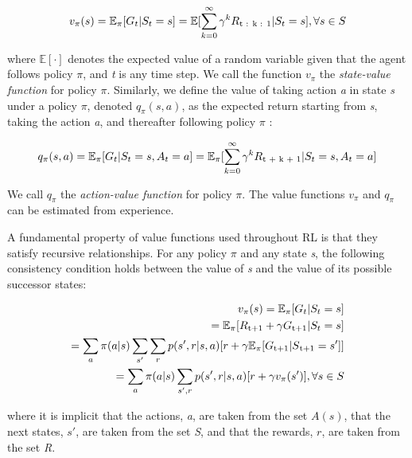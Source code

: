 \begin{equation}
  v_\pi(s) = \mathbb{E}_\pi[G_t | S_t = s] = \mathbb{E}[\sum_{k = 0} ^ {\infty} \gamma^k R\textsubscript{t : k : 1} | S_t = s], \forall s \in S
\end{equation}

where $\mathbb{E}[\cdot]$ denotes the expected value of a random variable given that the agent follows policy $\pi$, and \textit{t} is any time step. We call the function $v_\pi$ the \textit{state-value function} for policy $\pi$.
Similarly, we define the value of taking action \textit{a} in state \textit{s} under a policy $\pi$, denoted $q_\pi(s, a)$, as the expected return starting from \textit{s}, taking the action \textit{a}, and thereafter following policy $\pi$ :

\begin{equation}
  q_\pi(s,a) = \mathbb{E}_\pi[G_t | S_t = s, A_t = a] = \mathbb{E}_\pi[\sum_{k = 0}^{\infty}\gamma^k R\textsubscript{t + k + 1} |S_t = s, A_t = a]  
\end{equation}

We call $q_\pi$ the \textit{action-value function} for policy $\pi$. The value functions $v_\pi$ and $q_\pi$ can be estimated from experience.

A fundamental property of value functions used throughout RL is that they satisfy recursive relationships. For any policy $\pi$ and any state \textit{s}, the following consistency condition holds between the value of \textit{s} and the value of its possible successor states:

\begin{equation}
\begin{split}
  v_\pi(s) = \mathbb{E}_\pi[G_t | S_t = s] \\
           = \mathbb{E}_\pi[R\textsubscript{t+1} + \gamma G\textsubscript{t+1} |S_t = s] \\
           = \sum_{a}\pi(a|s)\sum_{s'}\sum_{r}p(s', r | s, a)[r + \gamma\mathbb{E}_\pi[G\textsubscript{t+1} | S\textsubscript{t+1} = s']] \\
           = \sum_{a}\pi(a|s)\sum_{s', r} p(s', r | s, a)[r + \gamma v_\pi (s')], \forall s \in S
\end{split}
\end{equation} 

where it is implicit that the actions, \textit{a}, are taken from the set $A(s)$, that the next states, $s'$, are taken from the set \textit{S}, and that the rewards, $r$, are taken from the set \textit{R}. 

